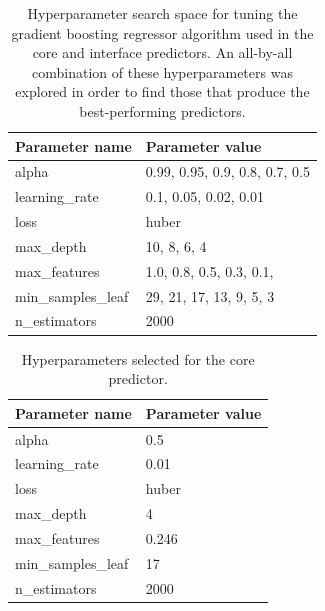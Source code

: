 \begin{table}[tb]
    \captionsetup{width=0.6\textwidth}
	\centering
	\caption[Hyperparameter search space.]{
        Hyperparameter search space for tuning the gradient boosting regressor algorithm used in the core and interface predictors. An all-by-all combination of these hyperparameters was explored in order to find those that produce the best-performing predictors.
    }
	\label{tab:gridsearch_parameters}
	\begin{tabular}{ l | l }
		\toprule
		Parameter name     & Parameter value                \\
		\midrule
		alpha              & 0.99, 0.95, 0.9, 0.8, 0.7, 0.5 \\
		learning\_rate     & 0.1, 0.05, 0.02, 0.01          \\
		loss               & huber                          \\
		max\_depth         & 10, 8, 6, 4                    \\
		max\_features      & 1.0, 0.8, 0.5, 0.3, 0.1,       \\
		min\_samples\_leaf & 29, 21, 17, 13, 9, 5, 3        \\
		n\_estimators      & 2000                           \\
		\bottomrule
	\end{tabular}
\end{table}

\begin{table}[tb]
	\centering
	\caption[Hyperparameters selected for the core predictor.]{
            Hyperparameters selected for the core predictor.
        }
    \label{tab:core_hyperparameters}
	\begin{tabular}{ l | l }
		\toprule
		Parameter name     & Parameter value \\
		\midrule
		alpha              & 0.5             \\
		learning\_rate     & 0.01            \\
		loss               & huber           \\
		max\_depth         & 4               \\
		max\_features      & 0.246           \\
		min\_samples\_leaf & 17              \\
		n\_estimators      & 2000            \\
		\bottomrule
	\end{tabular}
\end{table}

